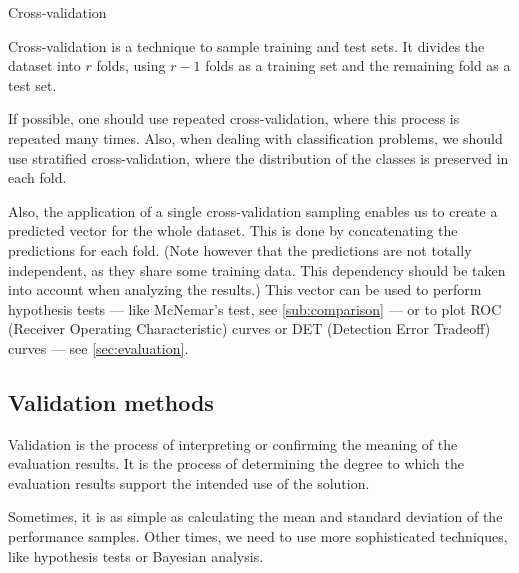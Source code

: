 \begin{figurebox}[label=fig:cross-validation]{Cross-validation}
  \centering
  \tcblower
  Cross-validation is a technique to sample training and test sets.  It divides the
  dataset into $r$ folds, using $r-1$ folds as a training set and the remaining fold as a
  test set.
\end{figurebox}

If possible, one should use repeated
cross-validation, where this process is repeated many times.  Also, when dealing with
classification problems, we should use stratified cross-validation, where the distribution
of the classes is preserved in each fold.

Also, the application of a single cross-validation sampling enables us to create a
predicted vector for the whole dataset.  This is done by concatenating the predictions for
each fold.  (Note however that the predictions are not totally independent, as they share
some training data.  This dependency should be taken into account when analyzing the
results.) This vector can be used to perform hypothesis tests --- like McNemar's test, see
\cref{sub:comparison} --- or to plot ROC (Receiver Operating Characteristic) curves or DET
(Detection Error Tradeoff) curves --- see \cref{sec:evaluation}.

\subsection{Validation methods}


Validation is the process of interpreting or confirming the meaning of the evaluation
results.  It is the process of determining the degree to which the evaluation results
support the intended use of the solution.

Sometimes, it is as simple as calculating the mean and standard deviation of the
performance samples.  Other times, we need to use more sophisticated techniques, like
hypothesis tests or Bayesian analysis.

